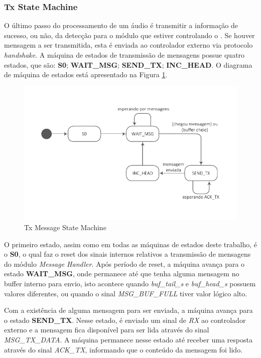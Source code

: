 \documentclass[monografia]{subfiles}
\begin{document}
		\subsubsection*{Tx State Machine}
		\label{sec:txStateMachineSection}
			O último passo do processamento de um áudio é transmitir a informação de sucesso, ou não, da detecção para o módulo que estiver controlando 
			o . Se houver mensagem a ser transmitida, esta é enviada ao controlador externo via protocolo \textit{handshake}.
			A máquina de estados de transmissão de mensagens possue quatro estados, que são: \textbf{S0}; \textbf{WAIT\_MSG}; \textbf{SEND\_TX}; \textbf{INC\_HEAD}.
			O diagrama de máquina de estados está apresentado na Figura \ref{fig:txMessageStatemachine}.


			\begin{figure}[!h]
			\centering
				\includegraphics[scale=1.3]{img/stateMachines/txMsgState.pdf}
			\caption{Tx Message State Machine}
			\label{fig:txMessageStatemachine}
			\end{figure}

			\newpage

			O primeiro estado, assim como em todas as máquinas de estados deste trabalho, é o \textbf{S0}, o qual faz o reset dos sinais internos relativos
			a transmissão de mensagens do módulo \textit{Message Handler}. Após período de reset, a máquina avança para o estado \textbf{WAIT\_MSG}, onde
			permanece até que tenha alguma mensagem no buffer interno para envio, isto acontece quando \textit{buf\_tail\_s} e \textit{buf\_head\_s}
			possuem valores diferentes, ou quando o sinal \textit{MSG\_BUF\_FULL} tiver valor lógico alto.

			Com a existência de alguma mensagem para ser enviada, a máquina avança para o estado \textbf{SEND\_TX}.
			Nesse estado, é enviado um sinal de \textit{RX} ao controlador externo e a mensagem fica disponível para ser lida através do 
			sinal \textit{MSG\_TX\_DATA}. A máquina permanece nesse estado até receber uma resposta através do sinal \textit{ACK\_TX}, informando
			que o conteúdo da mensagem foi lido.
\end{document}
